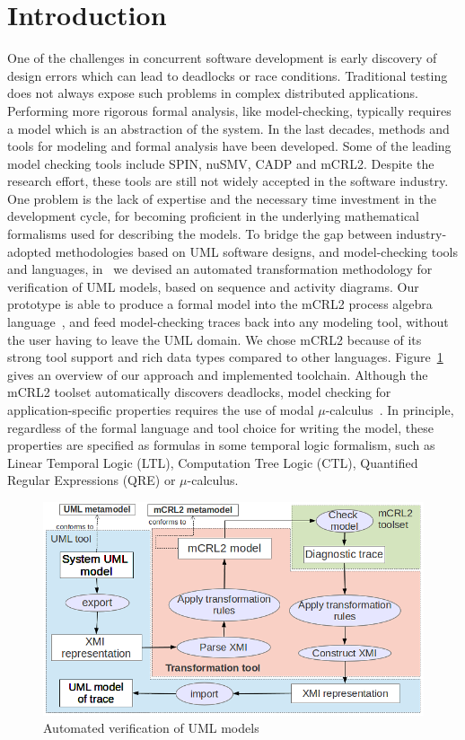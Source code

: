 \documentclass[letter]{llncs}
\newcommand{\figshrink}{\vspace{-.6cm}}
\newcommand{\figshrinkend}{}
\begin{document}
\section{Introduction}
\label{sec:Introduction}
One of the challenges in concurrent software development is early discovery of design errors which can lead to deadlocks or race conditions.
Traditional testing does not always expose such problems in complex distributed applications. Performing more rigorous formal analysis, like model-checking, 
typically requires a model which is an abstraction of the system.
In the last decades, methods and tools
for modeling and formal analysis have been developed. Some of the leading model checking tools include SPIN, nuSMV, CADP and mCRL2. 
Despite the research effort, these tools are still not widely accepted in the software industry. One problem is the lack of expertise and
the necessary time investment in the development cycle, for becoming proficient in
the underlying mathematical formalisms used for describing the models. 
To bridge the gap between industry-adopted methodologies based on UML software
designs, and model-checking tools and languages, in~\cite{DBLP:dblp_conf/nfm/RemenskaTWHVCB13} we devised 
an automated transformation methodology for verification of UML
models, based on sequence and activity diagrams. Our prototype is able to produce
a formal model into the mCRL2 process algebra language~\cite{FormalLanguagemCRL2}, and feed model-checking traces back into any modeling
tool, without the user having to leave the UML domain. We chose mCRL2 because of its strong tool support and rich data types compared to other languages.
Figure~\ref{fig:approach} gives an overview of our approach and implemented toolchain.
Although the mCRL2 toolset automatically discovers deadlocks, model checking
for application-specific properties requires the use of modal $\mu$-calculus~\cite{Groote05model-checkingprocesses}. In principle, regardless of the formal language and tool choice for writing the model, these properties 
are specified as formulas in some temporal logic formalism, such as Linear Temporal Logic (LTL), Computation Tree Logic (CTL), Quantified Regular Expressions (QRE) or $\mu$-calculus.
\begin{figure}[!t]
\centering
\figshrink
\includegraphics[width=0.7\linewidth,keepaspectratio=true]{./Approach.png}
\caption{Automated verification of UML models}
\label{fig:approach}
\figshrinkend
\end{figure}
\end{document}
